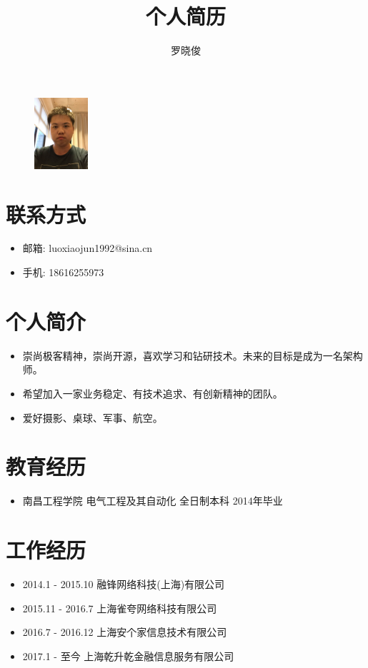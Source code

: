 \documentclass[a4paper,12pt]{article}
\title{个人简历}
\author{罗晓俊}
\begin{document}
	\begin{CJK}{UTF8}{gbsn}

		\maketitle{}

		\begin{figure}[h]
			\centering\includegraphics[height=100px]{webwxgetmsgimg.jpeg}
		\end{figure}

		\section{联系方式}
			\begin{itemize}
				\item{邮箱: luoxiaojun1992@sina.cn}
				\item{手机: 18616255973}
			\end{itemize}

		\section{个人简介}
			\begin{itemize}
				\item{崇尚极客精神，崇尚开源，喜欢学习和钻研技术。未来的目标是成为一名架构师。}
				\item{希望加入一家业务稳定、有技术追求、有创新精神的团队。}
				\item{爱好摄影、桌球、军事、航空。}
			\end{itemize}
		
		\section{教育经历}
			\begin{itemize}
				\item{南昌工程学院 电气工程及其自动化 全日制本科 2014年毕业}
			\end{itemize}
		
		\section{工作经历}
			\begin{itemize}
				\item{2014.1 - 2015.10 融锋网络科技(上海)有限公司}
				\item{2015.11 - 2016.7 上海雀夸网络科技有限公司}
				\item{2016.7 - 2016.12 上海安个家信息技术有限公司}
				\item{2017.1 - 至今 上海乾升乾金融信息服务有限公司}
			\end{itemize}
		

\end{CJK}
\end{document}
